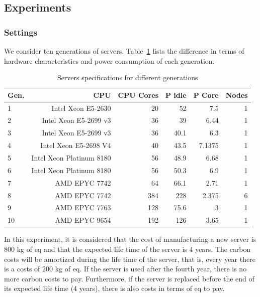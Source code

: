 \subsection{Experiments}

\subsubsection{Settings}

We consider ten generations of servers. Table~\ref{tab:servers_specs} lists the difference in terms of hardware characteristics and power consumption of each generation. 

\begin{table}[H]

  \caption{Servers specifications for different generations} \centering
  \label{tab:servers_specs} 
  \begin{tabular}{|l|r|r|r|r|r|}
   \hline
    
  \textbf{Gen.} & \textbf{CPU} &   \textbf{CPU Cores} & \textbf{P idle}  & \textbf{P Core} & \textbf{Nodes} \\
  \hline
    1 & Intel Xeon E5-2630 & 20 & 52 & 7.5 & 1 \\
  \hline
    2 & Intel Xeon E5-2699 v3& 36 & 39 & 6.44 & 1  \\
  \hline
    3 & Intel Xeon E5-2699 v3 & 36 & 40.1 & 6.3 & 1 \\
  \hline
     4 & Intel Xeon E5-2698 V4 &  40 & 43.5 & 7.1375 & 1 \\
  \hline
    5 & Intel Xeon Platinum 8180 & 56 & 48.9 & 6.68 & 1 \\
  \hline
    6 & Intel Xeon Platinum 8180 & 56 & 50.3 & 6.9 & 1 \\
  \hline
    7 & AMD EPYC 7742  & 64 & 66.1 & 2.71 & 1 \\
  \hline
    8 & AMD EPYC 7742  & 384 & 228 & 2.375 & 6 \\
  \hline
    9 & AMD EPYC 7763 & 128 & 75.6 & 3 & 1 \\
  \hline
    10 & AMD EPYC 9654 & 192 & 126 & 3.65 & 1 \\
  \hline
\end{tabular}  
\end{table}

In this experiment, it is considered that the cost of manufacturing a new server is 800 kg of  eq and that the expected life time of the server is 4 years. The carbon costs will be amortized during the life time of the server, that is, every year there is a costs of 200 kg of  eq. If the server is used after the fourth year, there is no more carbon costs to pay. Furthermore, if the server is replaced before the end of its expected life time (4 years), there is also costs in terms of   eq to pay. 

